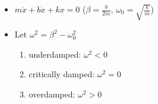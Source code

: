 

\vspace*{\fill}
\centering

\begin{itemize}
    \item $m \ddot{x} + b \dot{x} + k x = 0$ ($\displaystyle \beta = \frac{b}{2m}$, $\displaystyle \omega_0 = \sqrt{\frac{k}{m}}$) 

    \item Let $\omega^2 = \beta^2 - \omega_0^2$ 
    \begin{enumerate}
        \item underdamped: $\omega^2 < 0$
        \item critically damped: $\omega^2 = 0$
        \item overdamped: $\omega^2 > 0$
    \end{enumerate}
\end{itemize}

\centering
\vspace*{\fill}

